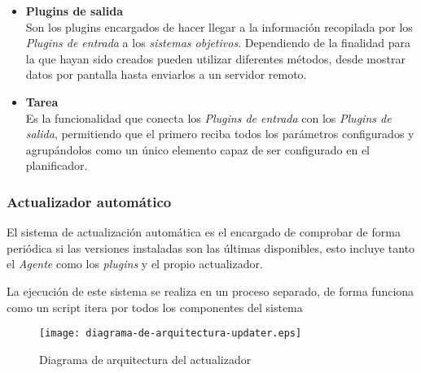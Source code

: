 \begin{enumerate}
\begin{itemize}
                        \item \textbf{Plugins de salida} \\
                        Son los plugins encargados de hacer llegar a la información recopilada por los \textit{Plugins de entrada} a los \textit{sistemas objetivos}. Dependiendo de la finalidad para la que hayan sido creados pueden utilizar diferentes métodos, desde mostrar datos por pantalla hasta enviarlos a un servidor remoto.
                        
                        \item \textbf{Tarea} \\
                        Es la funcionalidad que conecta los \textit{Plugins de entrada} con los \textit{Plugins de salida}, permitiendo que el primero reciba todos los parámetros configurados y agrupándolos como un único elemento capaz de ser configurado en el planificador.
                        
                    \end{itemize}
            \end{enumerate}

        \subsubsection{Actualizador automático}
            El sistema de actualización automática es el encargado de comprobar de forma periódica si las versiones instaladas son las últimas disponibles, esto incluye tanto el \textit{Agente} como los \textit{plugins} y el propio actualizador.
            
            La ejecución de este sistema se realiza en un proceso separado, de forma
            funciona como un script
             itera por todos los componentes del sistema
        
            

            \begin{figure}[h!]
            \centering
                \texttt{[image: diagrama-de-arquitectura-updater.eps]}
                \caption{Diagrama de arquitectura del actualizador}
                \label{fig:client_diagram}
            \end{figure}
            
            

            
            

